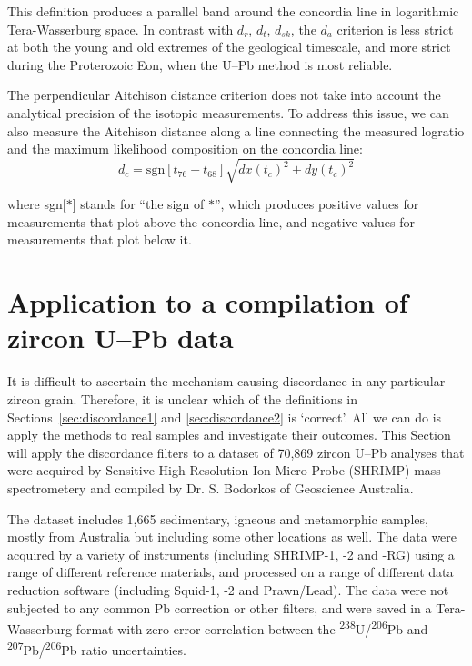 \documentclass[gchron, manuscript]{copernicus}
\begin{document}
This definition produces a parallel band around the concordia line in
logarithmic Tera-Wasserburg space. In contrast with $d_r$, $d_t$,
$d_{sk}$, the $d_a$ criterion is less strict at both the young and old
extremes of the geological timescale, and more strict during the
Proterozoic Eon, when the U--Pb method is most reliable.

The perpendicular Aitchison distance criterion does not take into
account the analytical precision of the isotopic measurements.  To
address this issue, we can also measure the Aitchison distance along a
line connecting the measured logratio and the maximum likelihood
composition on the concordia line:
\begin{equation}
  d_c = \mbox{sgn}[t_{76}-t_{68}] \sqrt{ dx(t_c)^2 + dy(t_c)^2 }
  \label{eq:da}
\end{equation}

\noindent where sgn[$\ast$] stands for ``the sign of $\ast$'', which
produces positive values for measurements that plot above the
concordia line, and negative values for measurements that plot below
it.

\section{Application to a compilation of zircon U--Pb data}
\label{sec:application}

It is difficult to ascertain the mechanism causing discordance in any
particular zircon grain. Therefore, it is unclear which of the
definitions in Sections~\ref{sec:discordance1} and
\ref{sec:discordance2} is `correct'. All we can do is apply the
methods to real samples and investigate their outcomes. This Section
will apply the discordance filters to a dataset of 70,869 zircon U--Pb
analyses that were acquired by Sensitive High Resolution Ion
Micro-Probe (SHRIMP) mass spectrometery and compiled by Dr. S.
Bodorkos of Geoscience Australia.

The dataset includes 1,665 sedimentary, igneous and metamorphic
samples, mostly from Australia but including some other locations as
well.  The data were acquired by a variety of instruments (including
SHRIMP-1, -2 and -RG) using a range of different reference materials,
and processed on a range of different data reduction software
(including Squid-1, -2 and Prawn/Lead). The data were not subjected to
any common Pb correction or other filters, and were saved in a
Tera-Wasserburg format with zero error correlation between the
\textsuperscript{238}U/\textsuperscript{206}Pb and
\textsuperscript{207}Pb/\textsuperscript{206}Pb ratio uncertainties.
\end{document}
